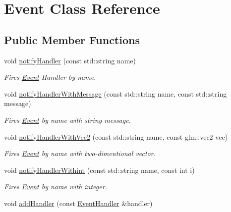 \hypertarget{class_event}{\section{Event Class Reference}
\label{class_event}
}
\subsection*{Public Member Functions}
\begin{DoxyCompactItemize}
\item 
\hypertarget{class_event_a144119cf594d4a6f6c2bf77811f223e3}{void \hyperlink{class_event_a144119cf594d4a6f6c2bf77811f223e3}{notify\+Handler} (const std\+::string name)}\label{class_event_a144119cf594d4a6f6c2bf77811f223e3}

\begin{DoxyCompactList}\small\item\em Fires \hyperlink{class_event}{Event} Handler by name. \end{DoxyCompactList}\item 
\hypertarget{class_event_aff88b52545b4bd41eb1e7c148acfa3c9}{void \hyperlink{class_event_aff88b52545b4bd41eb1e7c148acfa3c9}{notify\+Handler\+With\+Message} (const std\+::string name, const std\+::string message)}\label{class_event_aff88b52545b4bd41eb1e7c148acfa3c9}

\begin{DoxyCompactList}\small\item\em Fires \hyperlink{class_event}{Event} by name with string message. \end{DoxyCompactList}\item 
\hypertarget{class_event_a0521173a49e2c86e5d56aed25872114c}{void \hyperlink{class_event_a0521173a49e2c86e5d56aed25872114c}{notify\+Handler\+With\+Vec2} (const std\+::string name, const glm\+::vec2 vec)}\label{class_event_a0521173a49e2c86e5d56aed25872114c}

\begin{DoxyCompactList}\small\item\em Fires \hyperlink{class_event}{Event} by name with two-\/dimentional vector. \end{DoxyCompactList}\item 
\hypertarget{class_event_a9116b6d26e9d489b652d96d25caeea4d}{void \hyperlink{class_event_a9116b6d26e9d489b652d96d25caeea4d}{notify\+Handler\+Withint} (const std\+::string name, const int i)}\label{class_event_a9116b6d26e9d489b652d96d25caeea4d}

\begin{DoxyCompactList}\small\item\em Fires \hyperlink{class_event}{Event} by name with integer. \end{DoxyCompactList}\item 
\hypertarget{class_event_a6860c013fdd5c1bfea9c49fb6b627442}{void \hyperlink{class_event_a6860c013fdd5c1bfea9c49fb6b627442}{add\+Handler} (const \hyperlink{class_event_handler}{Event\+Handler} \&handler)}\label{class_event_a6860c013fdd5c1bfea9c49fb6b627442}


\end{DoxyCompactItemize}

